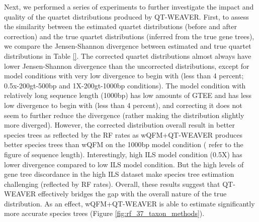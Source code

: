 \documentclass[10pt,a4paper]{article}
\newcommand{\addb}[1]{{\color{red} #1}}
\begin{document}
Next, we performed a series of experiments to further investigate the impact and quality of the quartet distributions produced by QT-WEAVER. First, to assess the similarity between the estimated quartet distributions (before and after correction) and the true quartet distributions (inferred from the true gene trees), we compare the Jensen-Shannon divergence between estimated and true quartet distributions in Table \ref{}. The corrected quartet distributions almost always have lower Jensen-Shannon divergence than the uncorrected distributions, except for model conditions with very low divergence to begin with (less than 4 percent; 0.5x-200gt-500bp and 1X-200gt-1000bp conditions). The model condition with relatively long sequence length (1000bp) has low amounts of GTEE and has less low divergence to begin with (less than 4 percent), and correcting it does not seem to further reduce the divergence (rather making the distribution slightly more diverged). However, the corrected distribution overall result in better species trees as reflected by the RF rates as wQFM+QT-WEAVER produces better species trees than wQFM on the 1000bp model condition (\addb{refer to the figure of sequence length}).
Interestingly, high ILS model condition (0.5X) has lower divergence compared to low ILS model condition. But the high levels of gene tree discordance in the high ILS dataset make species tree estimation challenging (reflected by RF rates). Overall, these results suggest that QT-WEAVER effectively bridges the gap with the overall nature of the true distribution. As an effect, wQFM+QT-WEAVER is able to estimate significantly more accurate species trees (Figure \ref{fig:rf_37_taxon_methods}).



\end{document}
